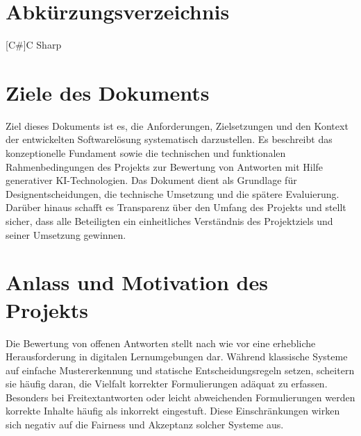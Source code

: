 \documentclass[a4paper,12pt]{article}
\begin{document}
\listoffigures

\newpage
\section*{Abkürzungsverzeichnis}
\begin{acronym}
  [C\#]{C Sharp}

\end{acronym}

\newpage
\section{Ziele des Dokuments}
Ziel dieses Dokuments ist es, die Anforderungen, Zielsetzungen und den Kontext der entwickelten Softwarelösung systematisch darzustellen. Es beschreibt das konzeptionelle Fundament sowie die technischen und funktionalen Rahmenbedingungen des Projekts zur Bewertung von Antworten mit Hilfe generativer KI-Technologien. Das Dokument dient als Grundlage für Designentscheidungen, die technische Umsetzung und die spätere Evaluierung. Darüber hinaus schafft es Transparenz über den Umfang des Projekts und stellt sicher, dass alle Beteiligten ein einheitliches Verständnis des Projektziels und seiner Umsetzung gewinnen.

\section{Anlass und Motivation des Projekts}
Die Bewertung von offenen Antworten stellt nach wie vor eine erhebliche Herausforderung in digitalen Lernumgebungen dar. Während klassische Systeme auf einfache Mustererkennung und statische Entscheidungsregeln setzen, scheitern sie häufig daran, die Vielfalt korrekter Formulierungen adäquat zu erfassen. Besonders bei Freitextantworten oder leicht abweichenden Formulierungen werden korrekte Inhalte häufig als inkorrekt eingestuft. Diese Einschränkungen wirken sich negativ auf die Fairness und Akzeptanz solcher Systeme aus.
\end{document}
